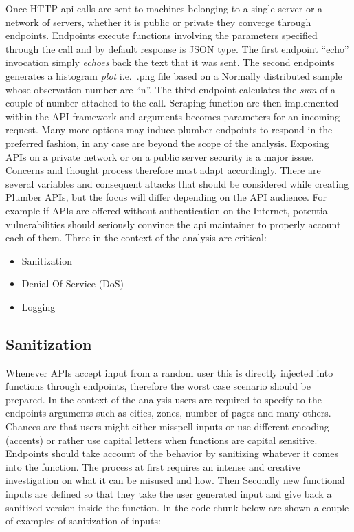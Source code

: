 \documentclass[
  12pt,
  a4paper,
  oneside]{book}
\providecommand{\tightlist}{%
  \setlength{\itemsep}{0pt}\setlength{\parskip}{0pt}}
\theoremstyle{definition}
\theoremstyle{definition}
\theoremstyle{definition}
\theoremstyle{remark}
\begin{document}
Once HTTP api calls are sent to machines belonging to a single server or a network of servers, whether it is public or private they converge through endpoints. Endpoints execute functions involving the parameters specified through the call and by default response is JSON type. The first endpoint ``echo'' invocation simply \emph{echoes} back the text that it was sent. The second endpoints generates a histogram \emph{plot} i.e.~.png file based on a Normally distributed sample whose observation number are ``n''. The third endpoint calculates the \emph{sum} of a couple of number attached to the call. Scraping function are then implemented within the API framework and arguments becomes parameters for an incoming request. Many more options may induce plumber endpoints to respond in the preferred fashion, in any case are beyond the scope of the analysis.
Exposing APIs on a private network or on a public server security is a major issue. Concerns and thought process therefore must adapt accordingly. There are several variables and consequent attacks that should be considered while creating Plumber APIs, but the focus will differ depending on the API audience. For example if APIs are offered without authentication on the Internet, potential vulnerabilities should seriously convince the api maintainer to properly account each of them. Three in the context of the analysis are critical:

\begin{itemize}
\tightlist
\item
  Sanitization
\item
  Denial Of Service (DoS)
\item
  Logging
\end{itemize}

\hypertarget{sanitize}{%
\subsection{Sanitization}\label{sanitize}}

Whenever APIs accept input from a random user this is directly injected into functions through endpoints, therefore the worst case scenario should be prepared. In the context of the analysis users are required to specify to the endpoints arguments such as cities, zones, number of pages and many others. Chances are that users might either misspell inputs or use different encoding (accents) or rather use capital letters when functions are capital sensitive. Endpoints should take account of the behavior by sanitizing whatever it comes into the function. The process at first requires an intense and creative investigation on what it can be misused and how. Then Secondly new functional inputs are defined so that they take the user generated input and give back a sanitized version inside the function. In the code chunk below are shown a couple of examples of sanitization of inputs:
\end{document}
